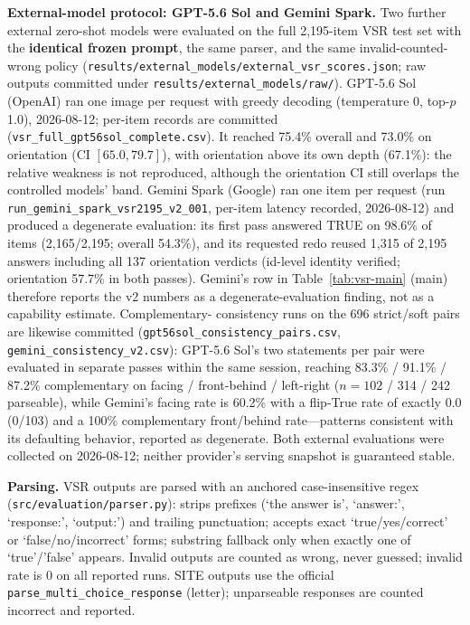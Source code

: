 \textbf{External-model protocol: GPT-5.6 Sol and Gemini Spark.}
\label{app:external}
Two further external zero-shot models were evaluated on the full 2{,}195-item
VSR test set with the \textbf{identical frozen prompt}, the same parser, and
the same invalid-counted-wrong policy
(\texttt{results/external\_models/external\_vsr\_scores.json}; raw outputs
committed under \texttt{results/external\_models/raw/}).
GPT-5.6 Sol (OpenAI) ran one image per request with greedy decoding
(temperature 0, top-$p$ 1.0), 2026-08-12; per-item records are committed
(\texttt{vsr\_full\_gpt56sol\_complete.csv}). It reached 75.4\%
overall and 73.0\% on orientation (CI $[65.0, 79.7]$), with orientation above
its own depth (67.1\%): the relative weakness is not reproduced, although
the orientation CI still overlaps the controlled models' band.
Gemini Spark (Google) ran one item per request (run
\texttt{run\_gemini\_spark\_vsr2195\_v2\_001}, per-item latency recorded,
2026-08-12) and produced a degenerate evaluation: its first pass answered
TRUE on 98.6\% of items (2{,}165/2{,}195; overall 54.3\%), and its requested
redo reused 1{,}315 of 2{,}195 answers including all 137 orientation verdicts
(id-level identity verified; orientation 57.7\% in both passes). Gemini's row
in Table~\ref{tab:vsr-main} (main) therefore reports the v2 numbers as a
degenerate-evaluation finding, not as a capability estimate. Complementary-
consistency runs on the 696 strict/soft pairs are likewise committed
(\texttt{gpt56sol\_consistency\_pairs.csv},
\texttt{gemini\_consistency\_v2.csv}): GPT-5.6 Sol's two statements per pair
were evaluated in separate passes within the same session, reaching 83.3\% /
91.1\% / 87.2\% complementary on facing / front-behind / left-right
($n{=}102$ / 314 / 242 parseable), while Gemini's facing rate is 60.2\% with
a flip-True rate of exactly 0.0 (0/103) and a 100\% complementary
front/behind rate---patterns consistent with its defaulting behavior,
reported as degenerate. Both external evaluations were collected on
2026-08-12; neither provider's serving snapshot is guaranteed stable.

\textbf{Parsing.} VSR outputs are parsed with an anchored case-insensitive
regex (\texttt{src/evaluation/parser.py}): strips prefixes
(`the answer is', `answer:', `response:', `output:') and trailing
punctuation; accepts exact `true/yes/correct' or `false/no/incorrect' forms;
substring fallback only when exactly one of `true'/'false' appears. Invalid
outputs are counted as wrong, never guessed; invalid rate is 0 on all reported
runs. SITE outputs use the official \texttt{parse\_multi\_choice\_response}
(letter); unparseable responses are counted incorrect and reported.

